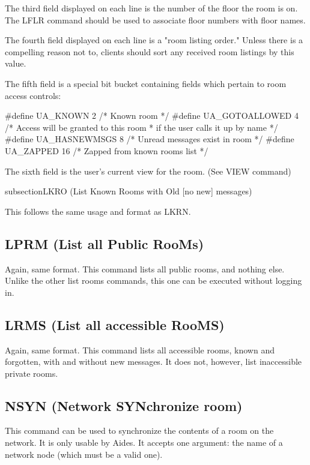  The third field displayed on each line is the number of the floor the room
is on.  The LFLR command should be used to associate floor numbers with
floor names.

 The fourth field displayed on each line is a "room listing order."  Unless
there is a compelling reason not to, clients should sort any received room
listings by this value.

 The fifth field is a special bit bucket containing fields which pertain to
room access controls:

\#define UA_KNOWN                2	/* Known room */
\#define UA_GOTOALLOWED          4	/* Access will be granted to this room
					 * if the user calls it up by name */
\#define UA_HASNEWMSGS           8	/* Unread messages exist in room */
\#define UA_ZAPPED              16	/* Zapped from known rooms list */

 The sixth field is the user's current view for the room. (See VIEW command)



subsection{LKRO (List Known Rooms with Old [no new] messages)}

 This follows the same usage and format as LKRN.



\subsection{LPRM (List all Public RooMs)}

 Again, same format.  This command lists all public rooms, and nothing else.
Unlike the other list rooms commands, this one can be executed without logging
in.



\subsection{LRMS (List all accessible RooMS)}

 Again, same format.  This command lists all accessible rooms, known and
forgotten, with and without new messages.  It does not, however, list
inaccessible private rooms.



\subsection{NSYN (Network SYNchronize room)}

 This command can be used to synchronize the contents of a room on the
network.  It is only usable by Aides.  It accepts one argument: the name of
a network node (which must be a valid one).

